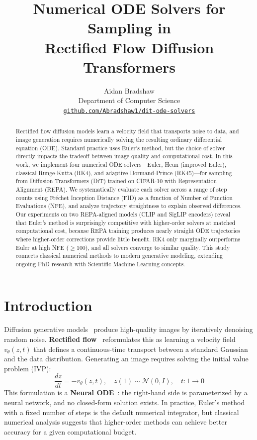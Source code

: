\documentclass[10pt,twocolumn]{article}
\title{Numerical ODE Solvers for Sampling in\\Rectified Flow Diffusion Transformers}
\author{Aidan Bradshaw\\
Department of Computer Science\\
\href{https://github.com/Abradshaw1/dit-ode-solvers}{\texttt{github.com/Abradshaw1/dit-ode-solvers}}}
\date{}
\begin{document}
\maketitle

\begin{abstract}
Rectified flow diffusion models learn a velocity field that transports noise to data, and image generation requires numerically solving the resulting ordinary differential equation (ODE). Standard practice uses Euler's method, but the choice of solver directly impacts the tradeoff between image quality and computational cost. In this work, we implement four numerical ODE solvers---Euler, Heun (improved Euler), classical Runge-Kutta (RK4), and adaptive Dormand-Prince (RK45)---for sampling from Diffusion Transformers (DiT) trained on CIFAR-10 with Representation Alignment (REPA). We systematically evaluate each solver across a range of step counts using Fr\'{e}chet Inception Distance (FID) as a function of Number of Function Evaluations (NFE), and analyze trajectory straightness to explain observed differences. Our experiments on two REPA-aligned models (CLIP and SigLIP encoders) reveal that Euler's method is surprisingly competitive with higher-order solvers at matched computational cost, because REPA training produces nearly straight ODE trajectories where higher-order corrections provide little benefit. RK4 only marginally outperforms Euler at high NFE (${\geq}100$), and all solvers converge to similar quality. This study connects classical numerical methods to modern generative modeling, extending ongoing PhD research with Scientific Machine Learning concepts.
\end{abstract}

\section{Introduction}

Diffusion generative models~\citep{peebles2023scalable} produce high-quality images by iteratively denoising random noise. \textbf{Rectified flow}~\citep{liu2023flow} reformulates this as learning a velocity field $v_\theta(z, t)$ that defines a continuous-time transport between a standard Gaussian and the data distribution. Generating an image requires solving the initial value problem (IVP):
\begin{equation}
    \frac{dz}{dt} = -v_\theta(z, t), \quad z(1) \sim \mathcal{N}(0, I), \quad t: 1 \to 0
    \label{eq:ode}
\end{equation}
This formulation is a \textbf{Neural ODE}~\citep{chen2018neural}: the right-hand side is parameterized by a neural network, and no closed-form solution exists. In practice, Euler's method with a fixed number of steps is the default numerical integrator, but classical numerical analysis suggests that higher-order methods can achieve better accuracy for a given computational budget.
\end{document}

